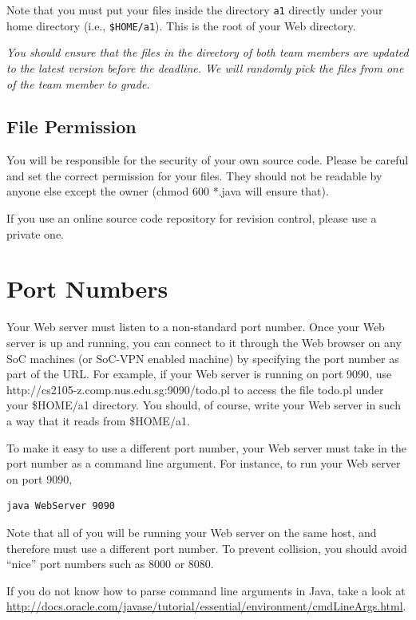 \documentclass[a4paper,11pt]{exam}
\begin{document}
Note that you must put your files inside the directory \texttt{a1} directly under your home directory (i.e., \texttt{\$HOME/a1}). This is the root of your Web directory.  

\textit{You should ensure that the files in the directory of both team members are updated to the latest version before the deadline.  We will randomly pick the files from one of the team member to grade.}

\subsection*{File Permission}

You will be responsible for the security of your own source code. Please be careful and set the correct permission for your files. They should not be readable by anyone else except the owner (chmod 600 *.java will ensure that).

If you use an online source code repository for revision control, please use a private one.  

\section*{Port Numbers}

Your Web server must listen to a non-standard port number. Once your Web server is up and running, you can connect to it through the Web browser on any SoC machines (or SoC-VPN enabled machine) by specifying the port number as part of the URL. For example, if your Web server is running on port 9090, use http://cs2105-z.comp.nus.edu.sg:9090/todo.pl to access the file todo.pl under your \$HOME/a1 directory. You should, of course, write your Web server in such a way that it reads from \$HOME/a1.

To make it easy to use a different port number, your Web server must take in the port number as a command line argument. For instance, to run your Web server on port 9090,

\begin{verbatim}
java WebServer 9090
\end{verbatim}

Note that all of you will be running your Web server on the same host, and therefore must use a different port number. To prevent collision, you should avoid ``nice'' port numbers such as 8000 or 8080.

If you do not know how to parse command line arguments in Java, take a look at \url{http://docs.oracle.com/javase/tutorial/essential/environment/cmdLineArgs.html}.
\end{document}
